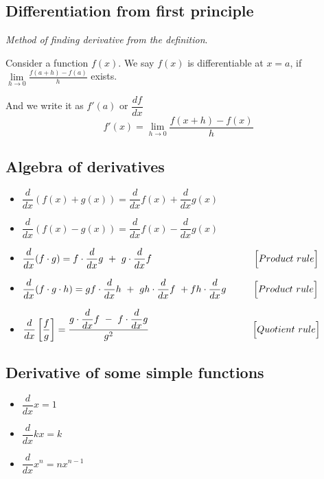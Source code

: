 \documentclass{article}
\begin{document}
\subsection{Differentiation from first principle}

\par \hspace{.4cm}\textit{Method of finding derivative from the definition}.\\
\par Consider a function $f(x)$. We say $f(x)$ is differentiable at $x=a$, if
\hspace{.15cm} $\lim\limits_{h \to 0}\frac{f(a + h) - f(a)}{h}$
\hspace{.15cm} exists.
\par And we write it as $f'(a)$ or $\dfrac{df}{dx}$\\
\[f'(x) = \lim\limits_{h \to 0}\frac{f(x + h) - f(x)}{h}\]

\subsection{Algebra of derivatives}
\begin{itemize}
  \item $\dfrac{d}{dx}(f(x) + g(x)) = \dfrac{d}{dx}f(x) + \dfrac{d}{dx}g(x)$
  \item $\dfrac{d}{dx}(f(x) - g(x)) = \dfrac{d}{dx}f(x) - \dfrac{d}{dx}g(x)$
  \item $\dfrac{d}{dx}(f\cdot g) = f\cdot\dfrac{d}{dx}g\ +\ g\cdot\dfrac{d}{dx}f {\hspace{3.75cm}\Bigl[Product\ rule\Bigr]}$
  \item $\dfrac{d}{dx}(f\cdot g\cdot h) = gf\cdot\dfrac{d}{dx}h\ +\ gh\cdot\dfrac{d}{dx}f\ +fh\cdot\dfrac{d}{dx}g {\hspace{1cm}\Bigl[Product\ rule\Bigr]}$
  \item $\dfrac{d}{dx}\left[\dfrac{f}{g}\right] = \dfrac{g\cdot\dfrac{d}{dx}f\ -\ f\cdot\dfrac{d}{dx}g}{{g}^2} {\hspace{3.8cm}\Bigl[Quotient\ rule\Bigr]}$
  
\end{itemize}


\subsection{Derivative of some simple functions}
\begin{itemize}
  \item $\dfrac{d}{dx}x = 1$
  \item $\dfrac{d}{dx}kx = k$
  \item $\dfrac{d}{dx}x^n = nx^{n-1}$
\end{itemize}
\end{document}
